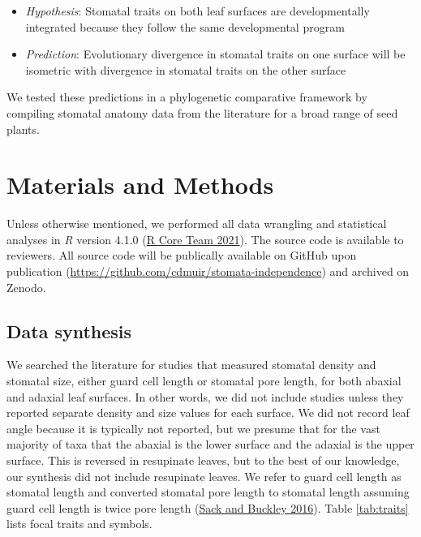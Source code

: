 \documentclass[
  10pt,
]{article}
\begin{document}

\begin{itemize}
\item
  \emph{Hypothesis}: Stomatal traits on both leaf surfaces are developmentally integrated because they follow the same developmental program
\item
  \emph{Prediction}: Evolutionary divergence in stomatal traits on one surface will be isometric with divergence in stomatal traits on the other surface
\end{itemize}

We tested these predictions in a phylogenetic comparative framework by compiling stomatal anatomy data from the literature for a broad range of seed plants.

\hypertarget{materials-and-methods}{%
\section{Materials and Methods}\label{materials-and-methods}}

Unless otherwise mentioned, we performed all data wrangling and statistical analyses in \emph{R} version 4.1.0 (\protect\hyperlink{ref-r_core_team_r:_2021}{R Core Team 2021}). The source code is available to reviewers. All source code will be publically available on GitHub upon publication (\url{https://github.com/cdmuir/stomata-independence}) and archived on Zenodo.

\hypertarget{data-synthesis}{%
\subsection{Data synthesis}\label{data-synthesis}}

We searched the literature for studies that measured stomatal density and stomatal size, either guard cell length or stomatal pore length, for both abaxial and adaxial leaf surfaces. In other words, we did not include studies unless they reported separate density and size values for each surface. We did not record leaf angle because it is typically not reported, but we presume that for the vast majority of taxa that the abaxial is the lower surface and the adaxial is the upper surface. This is reversed in resupinate leaves, but to the best of our knowledge, our synthesis did not include resupinate leaves. We refer to guard cell length as stomatal length and converted stomatal pore length to stomatal length assuming guard cell length is twice pore length (\protect\hyperlink{ref-sack_developmental_2016}{Sack and Buckley 2016}). Table \ref{tab:traits} lists focal traits and symbols.
\end{document}
